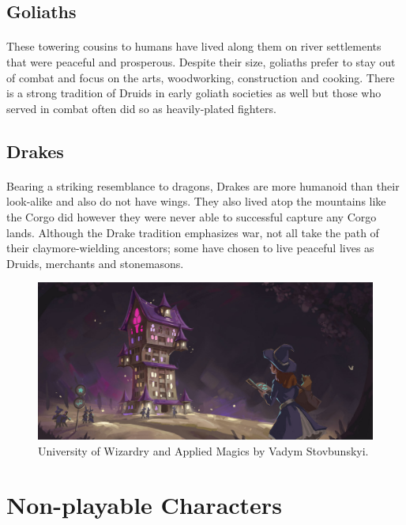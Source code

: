 \subsection{Goliaths}

\paragraph{} These towering cousins to humans have lived along them on river settlements that were peaceful and prosperous. Despite their size, goliaths prefer to stay out of combat and focus on the arts, woodworking, construction and cooking. There is a strong tradition of Druids in early goliath societies as well but those who served in combat often did so as heavily-plated fighters.

\subsection{Drakes}

\paragraph{} Bearing a striking resemblance to dragons, Drakes are more humanoid than their look-alike and also do not have wings. They also lived atop the mountains like the Corgo did however they were never able to successful capture any Corgo lands. Although the Drake tradition emphasizes war, not all take the path of their claymore-wielding ancestors; some have chosen to live peaceful lives as Druids, merchants and stonemasons.

\begin{figure}[h!]
    \centering
    \includegraphics[width=.9\linewidth]{images/setting-school.jpg}
    \caption{University of Wizardry and Applied Magics by Vadym Stovbunskyi.\nocite{stovbunskyi_university_2019}}
\end{figure}

\section{Non-playable Characters}

